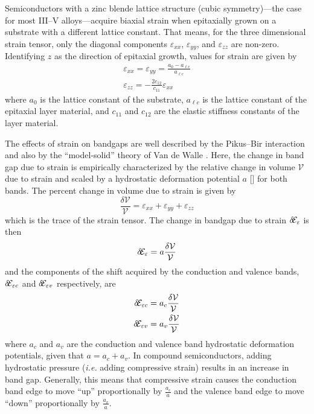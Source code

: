 {Semiconductors with a zinc blende lattice structure (cubic symmetry)---the case for most III--V alloys---acquire biaxial strain when epitaxially grown on a substrate with a different lattice constant.  That means, for the three dimensional strain tensor, only the diagonal components $\varepsilon_{xx}$, $\varepsilon_{yy}$, and $\varepsilon_{zz}$ are non-zero.  Identifying $z$ as the direction of epitaxial growth, values for strain are given by \cite{Chuang}
\begin{subequations}
\begin{gather}
\varepsilon_{xx} = \varepsilon_{yy} = \frac{a_0 - a_{\ell c}}{a_{\ell c}}\\
\varepsilon_{zz} = -\frac{2 c_{12}}{c_{11}} \varepsilon_{xx}
\end{gather}
\end{subequations}
where $a_0$ is the lattice constant of the substrate, $a_{\ell c}$ is the lattice constant of the epitaxial layer material, and $c_{11}$ and $c_{12}$ are the elastic stiffness constants of the layer material.

The effects of strain on bandgaps are well described by the Pikus--Bir interaction \cite{Pikus-Bir} and also by the ``model-solid'' theory of Van de Walle \cite{VandeWalle:PRB:1989}.  Here, the change in band gap due to strain is empirically characterized by the relative change in volume $\mathcal{V}$ due to strain and scaled by a hydrostatic deformation potential $a$ [] for both bands.  The percent change in volume due to strain is given by
\begin{equation}
\frac{\delta \mathcal{V}}{\mathcal{V}} = \varepsilon_{xx}+\varepsilon_{yy}+\varepsilon_{zz}
\end{equation}
which is the trace of the strain tensor.  The change in bandgap due to strain $\delta\!\EE_\varepsilon$ is then
\begin{equation}
\delta\!\EE_\varepsilon = a \frac{\delta \mathcal{V}}{\mathcal{V}}
\end{equation}
and the components of the shift acquired by the conduction and valence bands, $\delta\!\EE_{\varepsilon c}$ and $\delta\!\EE_{\varepsilon v}$ respectively, are
\begin{subequations}
\begin{gather}
\delta\!\EE_{\varepsilon c} = a_c \frac{\delta \mathcal{V}}{\mathcal{V}}\\
\delta\!\EE_{\varepsilon v} = a_v \frac{\delta \mathcal{V}}{\mathcal{V}}
\end{gather}
\end{subequations}
where $a_c$ and $a_v$ are the conduction and valence band hydrostatic deformation potentials, given that $a=a_c+a_v$.  In compound semiconductors, adding hydrostatic pressure (\emph{i.e.} adding compressive strain) results in an increase in band gap.  Generally, this means that compressive strain causes the conduction band edge to move ``up'' proportionally by $\frac{a_c}{a}$ and the valence band edge to move ``down'' proportionally by $\frac{a_v}{a}$.

}
